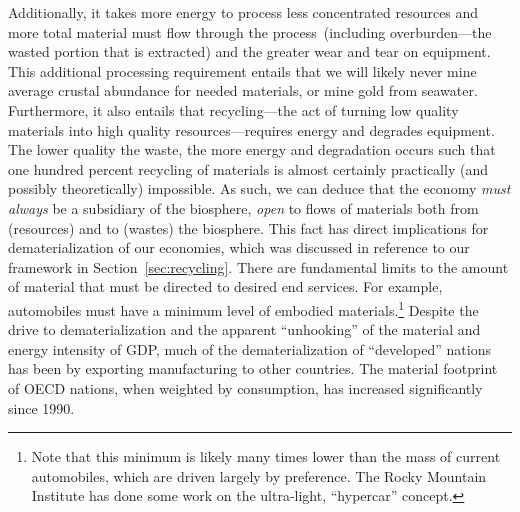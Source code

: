 Additionally,
it takes more energy to process less concentrated resources
and more total material must flow through 
the process~(including overburden---the wasted portion that is extracted)
and the greater wear and tear on equipment.
This additional processing requirement entails that 
we will likely never mine average crustal abundance for needed
materials, or mine gold from seawater.
Furthermore,
it also entails that recycling---the act
of turning low quality materials into
high quality resources---requires energy
and degrades equipment.
The lower quality the waste,
the more energy and degradation occurs
such that
one hundred percent recycling of materials
is almost certainly practically (and possibly theoretically) 
impossible.
As such, 
we can deduce that the economy \emph{must always} be
a subsidiary of the biosphere, \emph{open} to
flows of materials both from (resources) and 
to (wastes) the biosphere.
This fact has direct implications for dematerialization
of our economies, 
which was discussed in reference
to our framework in Section~\ref{sec:recycling}.
There are fundamental limits to the amount
of material that must be directed to desired
end services.
For example, automobiles 
must have a minimum level of embodied materials.\footnote{Note
that this minimum is likely many times lower than the 
mass of current automobiles,
which are driven largely by preference.
The Rocky Mountain Institute has done some
work on the ultra-light, 
``hypercar'' concept.\cite{RMI1996}}
Despite the drive to dematerialization
and the apparent ``unhooking'' of the
material and energy intensity of GDP,
much of the dematerialization of ``developed'' 
nations has been by exporting manufacturing
to other countries.\cite{allwood2012sustainable}
The material footprint of OECD nations, 
when weighted by consumption, 
has increased significantly since 1990.\cite{Wiedmann2013}



